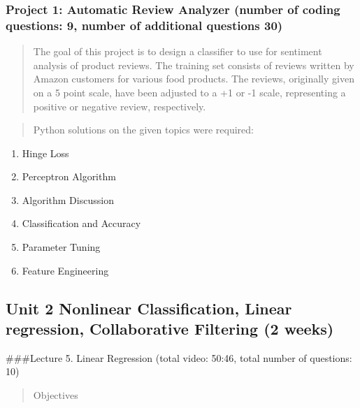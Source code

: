 \documentclass[]{article}
\providecommand{\tightlist}{%
  \setlength{\itemsep}{0pt}\setlength{\parskip}{0pt}}
\begin{document}
\hypertarget{project-1-automatic-review-analyzer-number-of-coding-questions-9-number-of-additional-questions-30}{%
\subsubsection{Project 1: Automatic Review Analyzer (number of coding
questions: 9, number of additional questions
30)}\label{project-1-automatic-review-analyzer-number-of-coding-questions-9-number-of-additional-questions-30}}

\begin{quote}
The goal of this project is to design a classifier to use for sentiment
analysis of product reviews. The training set consists of reviews
written by Amazon customers for various food products. The reviews,
originally given on a 5 point scale, have been adjusted to a +1 or -1
scale, representing a positive or negative review, respectively.
\end{quote}

\begin{quote}
Python solutions on the given topics were required:
\end{quote}

\begin{enumerate}
\def\labelenumi{\arabic{enumi}.}
\tightlist
\item
  Hinge Loss
\item
  Perceptron Algorithm
\item
  Algorithm Discussion
\item
  Classification and Accuracy
\item
  Parameter Tuning
\item
  Feature Engineering
\end{enumerate}

\hypertarget{unit-2-nonlinear-classification-linear-regression-collaborative-filtering-2-weeks}{%
\subsection{Unit 2 Nonlinear Classification, Linear regression,
Collaborative Filtering (2
weeks)}\label{unit-2-nonlinear-classification-linear-regression-collaborative-filtering-2-weeks}}

\#\#\#Lecture 5. Linear Regression (total video: 50:46, total number of
questions: 10)

\begin{quote}
Objectives
\end{quote}
\end{document}
